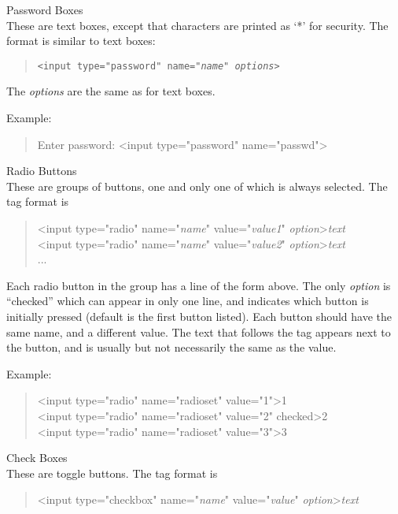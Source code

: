 \begin{description}
\item{Password Boxes}\\
These are text boxes, except that characters are printed as
`*' for security.  The format is similar to text boxes:
\begin{quote}
{\tt <input type="password" name="{\it name\/}" {\it options\/}>}
\end{quote}
The {\it options} are the same as for text boxes.

Example:
\begin{quote}
{\vt Enter password: <input type="password" name="passwd">}
\end{quote}

\item{Radio Buttons}\\
These are groups of buttons, one and only one of which is always
selected.  The tag format is
\begin{quote}
{\vt <input type="radio" name="{\it name\/}"
    value="{\it value1\/}" {\it option\/}>{\it text}}\\
{\vt <input type="radio" name="{\it name\/}"
    value="{\it value2\/}" {\it option\/}>{\it text}}\\
...\\
\end{quote}

Each radio button in the group has a line of the form above.  The only
{\it option} is ``{\vt checked}'' which can appear in only one line,
and indicates which button is initially pressed (default is the first
button listed).  Each button should have the same {\vt name}, and a
different {\vt value}.  The text that follows the tag appears next to
the button, and is usually but not necessarily the same as the value.

Example:
\begin{quote}
{\vt <input type="radio" name="radioset" value="1">1}\\
{\vt <input type="radio" name="radioset" value="2" checked>2}\\
{\vt <input type="radio" name="radioset" value="3">3}
\end{quote}


\item{Check Boxes}\\
These are toggle buttons.  The tag format is
\begin{quote}
{\vt <input type="checkbox" name="{\it name\/}"
    value="{\it value\/}" {\it option\/}>{\it text}}
\end{quote}


\end{description}
